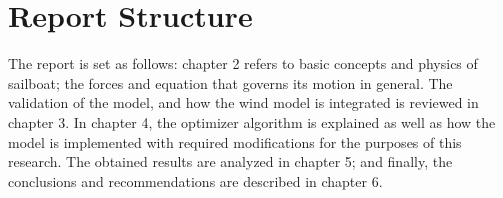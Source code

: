  \section{Report Structure}
The report is set as follows: chapter 2 refers to basic concepts and physics of sailboat; the forces and equation that governs its motion in general. The validation of the model, and how the wind model is integrated is reviewed in chapter 3. In chapter 4, the optimizer algorithm is explained as well as how the model is implemented with required modifications for the purposes of this research. The obtained results are analyzed in chapter 5; and finally, the conclusions and recommendations are described in chapter 6.\par 









